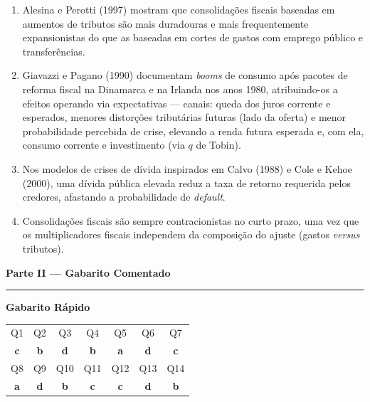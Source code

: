 \documentclass[12pt, a4paper]{article}
\begin{document}
\begin{enumerate}[label=\alph*)]
\item Alesina e Perotti (1997) mostram que consolidações fiscais baseadas em
aumentos de tributos são mais duradouras e mais frequentemente expansionistas
do que as baseadas em cortes de gastos com emprego público e transferências.
\item Giavazzi e Pagano (1990) documentam \emph{booms} de consumo após pacotes
de reforma fiscal na Dinamarca e na Irlanda nos anos 1980, atribuindo-os a
efeitos operando via expectativas --- canais: queda dos juros corrente e
esperados, menores distorções tributárias futuras (lado da oferta) e menor
probabilidade percebida de crise, elevando a renda futura esperada e, com ela,
consumo corrente e investimento (via $q$ de Tobin).
\item Nos modelos de crises de dívida inspirados em Calvo (1988) e Cole e Kehoe
(2000), uma dívida pública elevada reduz a taxa de retorno requerida pelos
credores, afastando a probabilidade de \emph{default}.
\item Consolidações fiscais são sempre contracionistas no curto prazo, uma vez
que os multiplicadores fiscais independem da composição do ajuste (gastos
\emph{versus} tributos).
\end{enumerate}

\newpage
\begin{center}
{\LARGE\bfseries\color{orangerbc} Parte II --- Gabarito Comentado}\\[0.3em]
\rule{\linewidth}{0.8pt}
\end{center}

\begin{tcolorbox}[standard, colback=correctbg, colframe=correctborder,
  arc=4pt, boxrule=1pt, left=8pt, right=8pt, top=6pt, bottom=6pt]
\centering
\textbf{\textcolor{correctborder}{Gabarito Rápido}}\\[0.6em]
\begin{tabular}{ccccccc}
\toprule
Q1 & Q2 & Q3 & Q4 & Q5 & Q6 & Q7 \\
\textbf{c} & \textbf{b} & \textbf{d} & \textbf{b} & \textbf{a} & \textbf{d} & \textbf{c} \\
\midrule
Q8 & Q9 & Q10 & Q11 & Q12 & Q13 & Q14 \\
\textbf{a} & \textbf{d} & \textbf{b} & \textbf{c} & \textbf{c} & \textbf{d} & \textbf{b} \\
\bottomrule
\end{tabular}
\end{tcolorbox}
\end{document}
